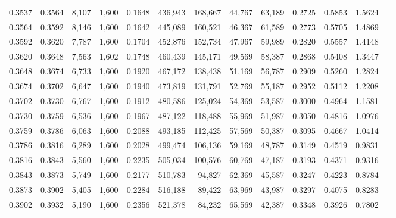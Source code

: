 \begin{tabular}{rrrrrrrrrrrrr}
0.3537 & 0.3564 &  8,107 & 1,600 &                                     0.1648 & 436,943 & 168,667 &  44,767 &  63,189 & 0.2725 & 0.5853 & 1.5624 \\
0.3564 & 0.3592 &  8,146 & 1,600 &                                     0.1642 & 445,089 & 160,521 &  46,367 &  61,589 & 0.2773 & 0.5705 & 1.4869 \\
0.3592 & 0.3620 &  7,787 & 1,600 &                                     0.1704 & 452,876 & 152,734 &  47,967 &  59,989 & 0.2820 & 0.5557 & 1.4148 \\
0.3620 & 0.3648 &  7,563 & 1,602 &                                     0.1748 & 460,439 & 145,171 &  49,569 &  58,387 & 0.2868 & 0.5408 & 1.3447 \\
0.3648 & 0.3674 &  6,733 & 1,600 &                                     0.1920 & 467,172 & 138,438 &  51,169 &  56,787 & 0.2909 & 0.5260 & 1.2824 \\
0.3674 & 0.3702 &  6,647 & 1,600 &                                     0.1940 & 473,819 & 131,791 &  52,769 &  55,187 & 0.2952 & 0.5112 & 1.2208 \\
0.3702 & 0.3730 &  6,767 & 1,600 &                                     0.1912 & 480,586 & 125,024 &  54,369 &  53,587 & 0.3000 & 0.4964 & 1.1581 \\
0.3730 & 0.3759 &  6,536 & 1,600 &                                     0.1967 & 487,122 & 118,488 &  55,969 &  51,987 & 0.3050 & 0.4816 & 1.0976 \\
0.3759 & 0.3786 &  6,063 & 1,600 &                                     0.2088 & 493,185 & 112,425 &  57,569 &  50,387 & 0.3095 & 0.4667 & 1.0414 \\
0.3786 & 0.3816 &  6,289 & 1,600 &                                     0.2028 & 499,474 & 106,136 &  59,169 &  48,787 & 0.3149 & 0.4519 & 0.9831 \\
0.3816 & 0.3843 &  5,560 & 1,600 &                                     0.2235 & 505,034 & 100,576 &  60,769 &  47,187 & 0.3193 & 0.4371 & 0.9316 \\
0.3843 & 0.3873 &  5,749 & 1,600 &                                     0.2177 & 510,783 &  94,827 &  62,369 &  45,587 & 0.3247 & 0.4223 & 0.8784 \\
0.3873 & 0.3902 &  5,405 & 1,600 &                                     0.2284 & 516,188 &  89,422 &  63,969 &  43,987 & 0.3297 & 0.4075 & 0.8283 \\
0.3902 & 0.3932 &  5,190 & 1,600 &                                     0.2356 & 521,378 &  84,232 &  65,569 &  42,387 & 0.3348 & 0.3926 & 0.7802 \\

\end{tabular}

